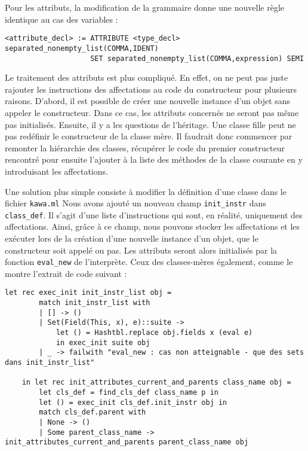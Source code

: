 \documentclass{article}
\begin{document}
\bigbreak
Pour les attributs, la modification de la grammaire donne une
nouvelle règle identique au cas des variables :
\begin{lstlisting}[style=mystyle]
    <attribute_decl> := ATTRIBUTE <type_decl> separated_nonempty_list(COMMA,IDENT) 
                    SET separated_nonempty_list(COMMA,expression) SEMI
\end{lstlisting}

Le traitement des attributs est plus compliqué.
En effet, on ne peut pas juste rajouter les instructions des affectations au code du constructeur pour 
plusieurs raisons. D'abord, il est possible de créer une nouvelle 
instance d'un objet sans appeler le constructeur. Dans ce cas, les attributs concernés
ne seront pas même pas initialisés. Ensuite, il y a les questions de l'héritage.
Une classe fille peut ne pas redéfinir le constructeur de la classe mère. Il faudrait donc commencer 
par remonter la hiérarchie des classes, récupérer le code du premier constructeur rencontré pour ensuite
l'ajouter à la liste des méthodes de la classe courante en y introduisant les affectations.


Une solution plus simple consiste à modifier 
la définition d'une classe dans le fichier \texttt{kawa.ml}
Nous avons ajouté un nouveau champ \texttt{init\_instr} 
dans \texttt{class\_def}. Il s'agit d'une liste 
d'instructions qui sont, en réalité, uniquement 
des affectations. Ainsi, grâce à ce champ, nous pouvons 
stocker les affectations et les exécuter lors de la création d'une nouvelle instance 
d'un objet, que le constructeur soit appelé ou pas. Les attributs seront alors 
initialisés par la fonction \texttt{eval\_new} de l'interprète. Ceux des 
classes-mères également, comme le montre l'extrait de code suivant : \\
\begin{lstlisting}[style=mystyle, language=caml]
    let rec exec_init init_instr_list obj = 
        match init_instr_list with
        | [] -> ()
        | Set(Field(This, x), e)::suite -> 
            let () = Hashtbl.replace obj.fields x (eval e) 
            in exec_init suite obj
        | _ -> failwith "eval_new : cas non atteignable - que des sets dans init_instr_list"

    in let rec init_attributes_current_and_parents class_name obj = 
        let cls_def = find_cls_def class_name p in  
        let () = exec_init cls_def.init_instr obj in 
        match cls_def.parent with
        | None -> ()
        | Some parent_class_name -> init_attributes_current_and_parents parent_class_name obj
\end{lstlisting}
\end{document}
